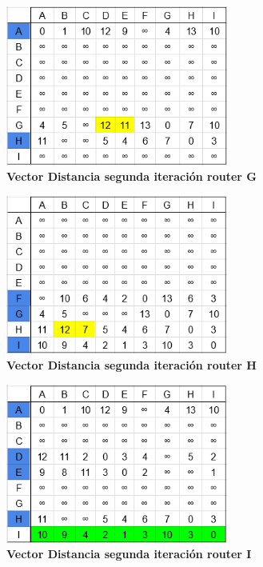\documentclass[12pt]{article}
\begin{document}
\begin{figure}[H] 
\centering 
\includegraphics[width=0.65\textwidth]{imagenes/2G2.png} \caption{\small \textbf{Vector Distancia segunda iteración router G}}
\label{fig:diagrama_32} 
\end{figure}
\begin{figure}[H] 
\centering 
\includegraphics[width=0.65\textwidth]{imagenes/2H2.png} \caption{\small \textbf{Vector Distancia segunda iteración router H}}
\label{fig:diagrama_33} 
\end{figure}
\begin{figure}[H] 
\centering 
\includegraphics[width=0.65\textwidth]{imagenes/2I2.png} \caption{\small \textbf{Vector Distancia segunda iteración router I}}
\label{fig:diagrama_34} 
\end{figure}
\end{document}
